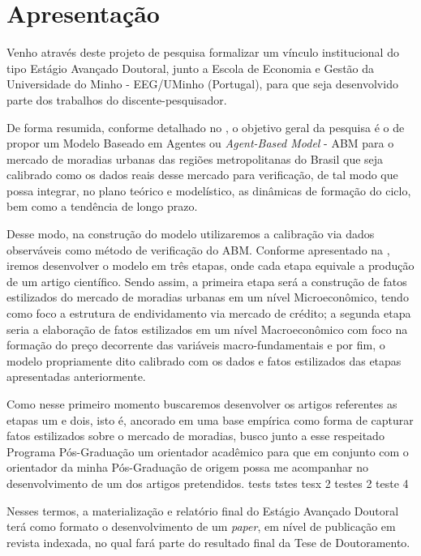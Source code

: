 \section{Apresentação}



Venho através deste projeto de pesquisa formalizar um vínculo institucional do tipo Estágio Avançado Doutoral, junto a Escola de Economia e Gestão da Universidade do Minho - EEG/UMinho (Portugal), para que seja desenvolvido parte dos trabalhos do discente-pesquisador.


De forma resumida, conforme detalhado no , o objetivo geral da pesquisa é o de propor um Modelo Baseado em Agentes ou \textit{Agent-Based Model} - ABM para o mercado de moradias urbanas das regiões metropolitanas do Brasil que seja calibrado como os dados reais desse mercado para verificação, de tal modo que possa integrar, no plano teórico e modelístico, as dinâmicas de formação do ciclo, bem como a tendência de longo prazo.

Desse modo, na construção do modelo utilizaremos a calibração via dados observáveis como método de verificação do ABM. Conforme apresentado na , iremos desenvolver o modelo em três etapas, onde cada etapa equivale a produção de um artigo científico. Sendo assim, a primeira etapa será a construção de fatos estilizados do mercado de moradias urbanas em um nível Microeconômico, tendo como foco a estrutura de endividamento via mercado de crédito; a segunda etapa seria a elaboração de fatos estilizados em um nível Macroeconômico com foco na formação do preço decorrente das variáveis macro-fundamentais e por fim, o modelo propriamente dito calibrado com os dados e fatos estilizados das etapas apresentadas anteriormente.

Como nesse primeiro momento buscaremos desenvolver os artigos referentes as etapas um e dois, isto é, ancorado em uma base empírica como forma de capturar fatos estilizados sobre o mercado de moradias, busco junto a esse respeitado Programa Pós-Graduação um orientador acadêmico para que em conjunto com o orientador da minha Pós-Graduação de origem possa me acompanhar no desenvolvimento de um dos artigos pretendidos. tests tstes tesx 2 testes 2 teste 4

Nesses termos, a materialização e relatório final do Estágio Avançado Doutoral terá como formato o desenvolvimento de um \textit{paper}, em nível de publicação em revista indexada, no qual fará parte do resultado final da Tese de Doutoramento.